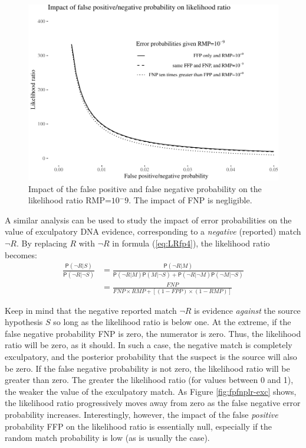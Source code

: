 \documentclass[
  10pt,
  dvipsnames,enabledeprecatedfontcommands]{scrartcl}
\newcommand{\n}{\neg}
\newcommand{\pr}[1]{\mathsf{P}(#1)}
\begin{document}
\begin{figure}

\begin{center}\includegraphics[width=1\linewidth]{lr-chapter4_files/figure-latex/fig-fpfnplr-1} \end{center}
\caption{Impact of the false positive and false negative probability on the likelihood ratio RMP=$10{^-9}$. The impact of FNP is negligible.}
\label{fig:fpfnplr}
\end{figure}

A similar analysis can be used to study the impact of error
probabilities on the value of exculpatory DNA evidence, corresponding to
a \textit{negative} (reported) match \(\neg R\). By replacing \(R\) with
\(\neg R\) in formula (\ref{eq:LRfp4}), the likelihood ratio becomes:
\begin{align}
\label{eq:LR-match-exc}
\frac{\pr{\neg R \vert S}}{\pr{\neg R \vert \neg S}} & = 
\frac{\pr{\neg R \vert M}}{\pr{\neg R \vert M }\pr{M \vert \n S} + \pr{\neg R \vert \n M}\pr{\n M \vert \n S}}\\
& = \frac{FNP}{FNP\times RMP + [(1-FPP) \times (1-RMP)]}
\end{align}

\noindent Keep in mind that the negative reported match \(\neg R\) is
evidence \textit{against} the source hypothesis \(S\) so long as the
likelihood ratio is below one. At the extreme, if the false negative
probability FNP is zero, the numerator is zero. Thus, the likelihood
ratio will be zero, as it should. In such a case, the negative match is
completely exculpatory, and the posterior probability that the suspect
is the source will also be zero. If the false negative probability is
not zero, the likelihood ratio will be greater than zero. The greater
the likelihood ratio (for values between 0 and 1), the weaker the value
of the exculpatory match. As Figure \ref{fig:fpfnplr-exc} shows, the
likelihood ratio progressively moves away from zero as the false
negative error probability increases. Interestingly, however, the impact
of the false \textit{positive} probability FFP on the likelihood ratio
is essentially null, especially if the random match probability is low
(as is usually the case).
\end{document}
